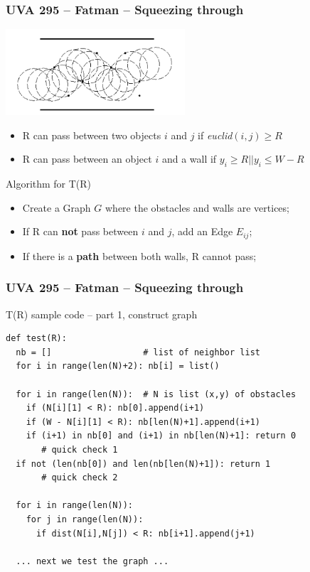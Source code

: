 \documentclass{beamer}
\begin{document}
\begin{frame}
  \frametitle{UVA 295 -- Fatman -- Squeezing through}

  {\smaller
    \begin{center}
      \includegraphics[width=0.5\textwidth]{img/fatman}
    \end{center}

    \begin{itemize}
    \item R can pass between two objects $i$ and $j$ if \emph{euclid}$(i,j) \geq R$
    \item R can pass between an object $i$ and a wall if $y_i \geq R || y_i \leq W-R$
    \end{itemize}

    \bigskip

    \begin{exampleblock}{Algorithm for T(R)}
      \begin{itemize}
      \item Create a Graph $G$ where the obstacles and walls are vertices;
      \item If R can {\bf not} pass between $i$ and $j$, add an Edge $E_{ij}$;
      \item If there is a {\bf path} between both walls, \alert{R cannot pass};
      \end{itemize}
    \end{exampleblock}
  }
\end{frame}

\begin{frame}[fragile]
  \frametitle{UVA 295 -- Fatman -- Squeezing through}

  {\smaller
  \begin{block}{T(R) sample code -- part 1, construct graph}
\begin{verbatim}
def test(R):
  nb = []                  # list of neighbor list
  for i in range(len(N)+2): nb[i] = list()

  for i in range(len(N)):  # N is list (x,y) of obstacles
    if (N[i][1] < R): nb[0].append(i+1)
    if (W - N[i][1] < R): nb[len(N)+1].append(i+1)
    if (i+1) in nb[0] and (i+1) in nb[len(N)+1]: return 0
       # quick check 1
  if not (len(nb[0]) and len(nb[len(N)+1]): return 1
       # quick check 2

  for i in range(len(N)):
    for j in range(len(N)):
      if dist(N[i],N[j]) < R: nb[i+1].append(j+1)

  ... next we test the graph ...
\end{verbatim}
  \end{block}
  }
\end{frame}
\end{document}
